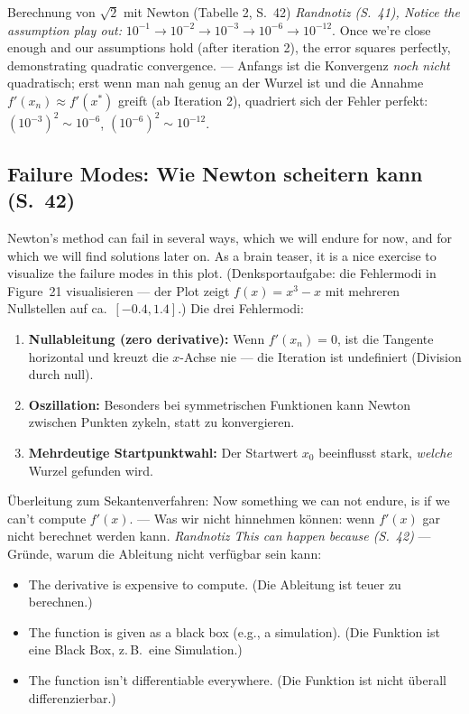 \begin{bspbox}{Berechnung von $\sqrt{2}$ mit Newton (Tabelle 2, S.~42)}
\emph{Randnotiz (S.~41), \glqq Notice the assumption play out\grqq:} $10^{-1} \to 10^{-2} \to 10^{-3} \to 10^{-6} \to 10^{-12}$. \glqq Once we're close enough and our assumptions hold (after iteration 2), the error squares perfectly, demonstrating quadratic convergence.\grqq{} — Anfangs ist die Konvergenz \emph{noch nicht} quadratisch; erst wenn man nah genug an der Wurzel ist und die Annahme $f'(x_n) \approx f'(x^*)$ greift (ab Iteration 2), quadriert sich der Fehler perfekt: $(10^{-3})^2 \sim 10^{-6}$, $(10^{-6})^2 \sim 10^{-12}$.
\end{bspbox}

\subsection{Failure Modes: Wie Newton scheitern kann (S.~42)}
\glqq Newton's method can fail in several ways, which we will endure for now, and for which we will find solutions later on. As a brain teaser, it is a nice exercise to visualize the failure modes in this plot.\grqq{} (Denksportaufgabe: die Fehlermodi in Figure~21 visualisieren — der Plot zeigt $f(x) = x^3 - x$ mit mehreren Nullstellen auf ca.\ $[-0.4, 1.4]$.) Die drei Fehlermodi:
\begin{enumerate}[nosep]
  \item \textbf{Nullableitung (zero derivative):} Wenn $f'(x_n) = 0$, ist die Tangente horizontal und kreuzt die $x$-Achse nie — die Iteration ist undefiniert (Division durch null).
  \item \textbf{Oszillation:} Besonders bei symmetrischen Funktionen kann Newton zwischen Punkten zykeln, statt zu konvergieren.
  \item \textbf{Mehrdeutige Startpunktwahl:} Der Startwert $x_0$ beeinflusst stark, \emph{welche} Wurzel gefunden wird.
\end{enumerate}
Überleitung zum Sekantenverfahren: \glqq Now something we can not endure, is if we can't compute $f'(x)$.\grqq{} — Was wir nicht hinnehmen können: wenn $f'(x)$ gar nicht berechnet werden kann. \emph{Randnotiz \glqq This can happen because\grqq{} (S.~42)} — Gründe, warum die Ableitung nicht verfügbar sein kann:
\begin{itemize}[nosep]
  \item \glqq The derivative is expensive to compute.\grqq{} (Die Ableitung ist teuer zu berechnen.)
  \item \glqq The function is given as a black box (e.g., a simulation).\grqq{} (Die Funktion ist eine Black Box, z.\,B.\ eine Simulation.)
  \item \glqq The function isn't differentiable everywhere.\grqq{} (Die Funktion ist nicht überall differenzierbar.)
\end{itemize}

